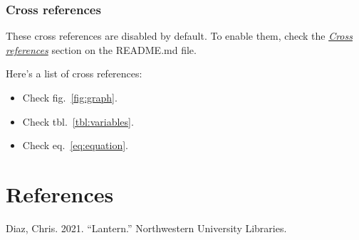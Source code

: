 \documentclass[
  11pt,
,
onecolumn,
openany
]{book}
\providecommand{\tightlist}{%
  \setlength{\itemsep}{0pt}\setlength{\parskip}{0pt}}
\newenvironment{CSLReferences}%
  {}%
  {\par}
\begin{document}
\hypertarget{cross-references}{%
\subsection{Cross references}\label{cross-references}}

These cross references are disabled by default. To enable them, check the
\emph{\href{https://github.com/wikiti/pandoc-book-template\#cross-references}{Cross
references}} section on the README.md file.

Here's a list of cross references:

\begin{itemize}
\tightlist
\item
  Check fig.~\ref{fig:graph}.
\item
  Check tbl.~\ref{tbl:variables}.
\item
  Check eq.~\ref{eq:equation}.
\end{itemize}

\hypertarget{bibliography}{%
\chapter*{References}\label{bibliography}}

\hypertarget{refs}{}
\begin{CSLReferences}{1}{0}
\leavevmode{}%
Diaz, Chris. 2021. {``Lantern.''} Northwestern University Libraries.

\end{CSLReferences}
\end{document}
